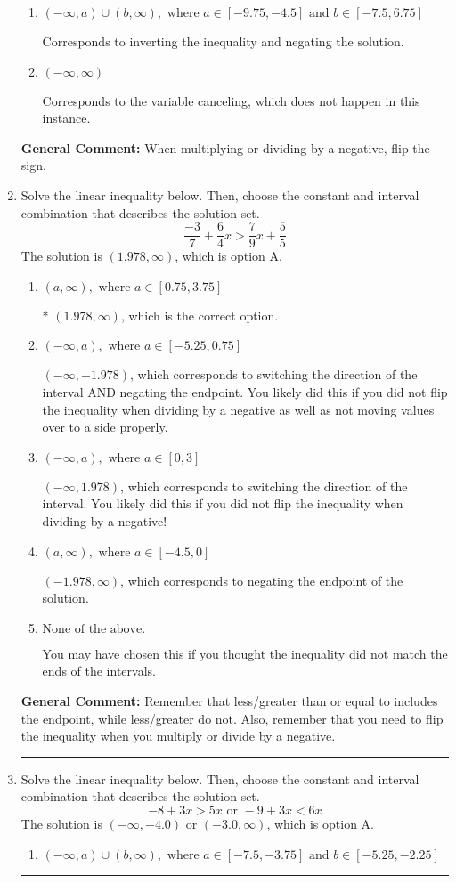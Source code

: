 \documentclass{extbook}[14pt]
\newcommand{\litem}[1]{\item #1

\rule{\textwidth}{0.4pt}}
\begin{document}
\begin{enumerate}
{\begin{enumerate}[label=\Alph*.]
 * Correct option.
\item \( (-\infty, a) \cup (b, \infty), \text{ where } a \in [-9.75, -4.5] \text{ and } b \in [-7.5, 6.75] \)

Corresponds to inverting the inequality and negating the solution.
\item \( (-\infty, \infty) \)

Corresponds to the variable canceling, which does not happen in this instance.
\end{enumerate}

\textbf{General Comment:} When multiplying or dividing by a negative, flip the sign.
}
\litem{
Solve the linear inequality below. Then, choose the constant and interval combination that describes the solution set.
\[ \frac{-3}{7} + \frac{6}{4} x > \frac{7}{9} x + \frac{5}{5} \]The solution is \( (1.978, \infty) \), which is option A.\begin{enumerate}[label=\Alph*.]
\item \( (a, \infty), \text{ where } a \in [0.75, 3.75] \)

* $(1.978, \infty)$, which is the correct option.
\item \( (-\infty, a), \text{ where } a \in [-5.25, 0.75] \)

 $(-\infty, -1.978)$, which corresponds to switching the direction of the interval AND negating the endpoint. You likely did this if you did not flip the inequality when dividing by a negative as well as not moving values over to a side properly.
\item \( (-\infty, a), \text{ where } a \in [0, 3] \)

 $(-\infty, 1.978)$, which corresponds to switching the direction of the interval. You likely did this if you did not flip the inequality when dividing by a negative!
\item \( (a, \infty), \text{ where } a \in [-4.5, 0] \)

 $(-1.978, \infty)$, which corresponds to negating the endpoint of the solution.
\item \( \text{None of the above}. \)

You may have chosen this if you thought the inequality did not match the ends of the intervals.
\end{enumerate}

\textbf{General Comment:} Remember that less/greater than or equal to includes the endpoint, while less/greater do not. Also, remember that you need to flip the inequality when you multiply or divide by a negative.
}
\litem{
Solve the linear inequality below. Then, choose the constant and interval combination that describes the solution set.
\[ -8 + 3 x > 5 x \text{ or } -9 + 3 x < 6 x \]The solution is \( (-\infty, -4.0) \text{ or } (-3.0, \infty) \), which is option A.\begin{enumerate}[label=\Alph*.]
\item \( (-\infty, a) \cup (b, \infty), \text{ where } a \in [-7.5, -3.75] \text{ and } b \in [-5.25, -2.25] \)


\end{enumerate}}
\end{enumerate}
\end{document}
